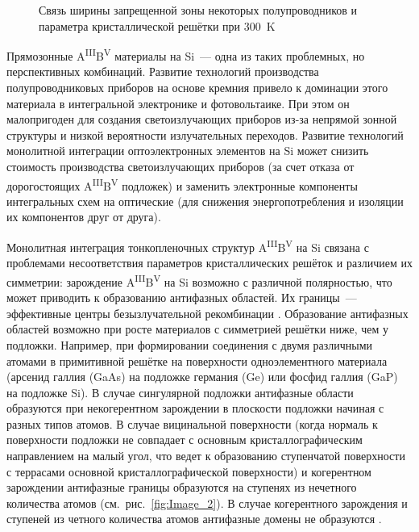 \begin{figure}[ht]  \caption{Связь ширины запрещенной зоны некоторых полупроводников и
параметра кристаллической решётки при 300~\si{\kelvin}}\label{fig:Image_1}
	\end{figure}

Прямозонные A\textsuperscript{III}B\textsuperscript{V} материалы на Si~--- одна
из таких проблемных, но перспективных комбинаций. Развитие технологий
производства полупроводниковых приборов на основе кремния привело к  доминации
этого материала в интегральной электронике и фотовольтаике. При этом он
малопригоден для создания светоизлучающих приборов из-за непрямой зонной
структуры и низкой вероятности излучательных переходов. Развитие технологий
монолитной интеграции оптоэлектронных элементов на Si может снизить стоимость
производства светоизлучающих приборов (за счет отказа от дорогостоящих
A\textsuperscript{III}B\textsuperscript{V} подложек) и заменить электронные
компоненты интегральных схем на оптические (для снижения энергопотребления и
изоляции их компонентов друг от друга).

Монолитная интеграция тонкопленочных структур
A\textsuperscript{III}B\textsuperscript{V} на Si связана с проблемами
несоответствия параметров кристаллических решёток и различием их симметрии:
зарождение A\textsuperscript{III}B\textsuperscript{V} на Si возможно с
различной полярностью, что может приводить к образованию антифазных областей.
Их границы~--- эффективные центры безызлучательной рекомбинации
\cite{Takagi1998}. Образование антифазных областей возможно при росте
материалов с симметрией решётки ниже, чем у подложки. Например, при
формировании соединения с двумя различными атомами в примитивной решётке на
поверхности одноэлементного материала (арсенид галлия (GaAs) на подложке
германия (Ge) или фосфид галлия (GaP) на подложке Si). В случае сингулярной
подложки антифазные области образуются при некогерентном зарождении в плоскости
подложки начиная с разных типов атомов. В случае вицинальной поверхности (когда
нормаль к поверхности подложки не совпадает с основным кристаллографическим
направлением на малый угол, что ведет к образованию ступенчатой поверхности с
террасами основной кристаллографической поверхности) и когерентном зарождении
антифазные границы образуются на ступенях из нечетного количества атомов
(см.~рис.~\cref{fig:Image_2}). В случае когерентного зарождения и ступеней из
четного количества атомов антифазные домены не образуются \cite{Faucher2016}.

